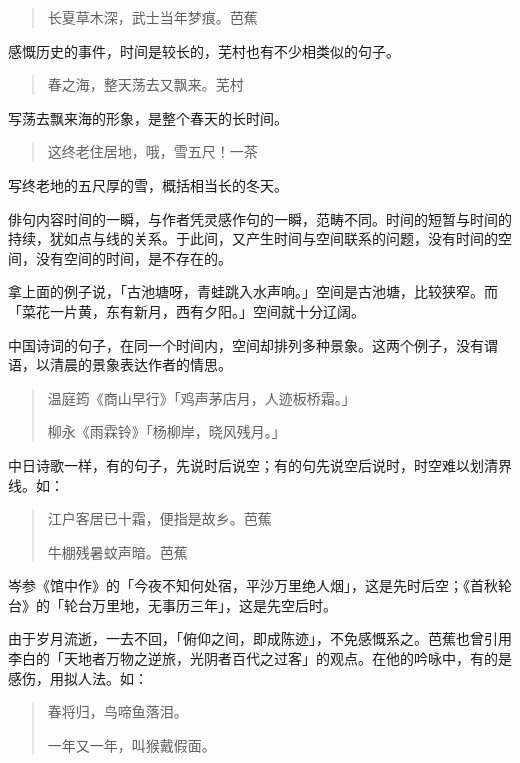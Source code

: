 {  \begin{quote}
      长夏草木深，武士当年梦痕。\hfill 芭蕉
  \end{quote}

  感慨历史的事件，时间是较长的，芜村也有不少相类似的句子。

  \begin{quote}
      春之海，整天荡去又飘来。\hfill 芜村
  \end{quote}

  写荡去飘来海的形象，是整个春天的长时间。

  \begin{quote}
      这终老住居地，哦，雪五尺！\hfill 一茶
  \end{quote}

  写终老地的五尺厚的雪，概括相当长的冬天。

  俳句内容时间的一瞬，与作者凭灵感作句的一瞬，范畴不同。时间的短暂与时间的持续，犹如点与线的关系。于此间，又产生时间与空间联系的问题，没有时间的空间，没有空间的时间，是不存在的。

  拿上面的例子说，「古池塘呀，青蛙跳入水声响。」空间是古池塘，比较狭窄。而「菜花一片黄，东有新月，西有夕阳。」空间就十分辽阔。

  中国诗词的句子，在同一个时间内，空间却排列多种景象。这两个例子，没有谓语，以清晨的景象表达作者的情思。
  \begin{quote}
      温庭筠《商山早行》「鸡声茅店月，人迹板桥霜。」

      柳永《雨霖铃》「杨柳岸，晓风残月。」
  \end{quote}

  中日诗歌一样，有的句子，先说时后说空；有的句先说空后说时，时空难以划清界线。如：

  \begin{quote}
      江户客居已十霜，便指是故乡。\hfill 芭蕉

      牛棚残暑蚊声暗。\hfill 芭蕉
  \end{quote}

  岑参《馆中作》的「今夜不知何处宿，平沙万里绝人烟」，这是先时后空；《首秋轮台》的「轮台万里地，无事历三年」，这是先空后时。

  由于岁月流逝，一去不回，「俯仰之间，即成陈迹」，不免感慨系之。芭蕉也曾引用李白的「天地者万物之逆旅，光阴者百代之过客」的观点。在他的吟咏中，有的是感伤，用拟人法。如：

  \begin{quote}
      春将归，鸟啼鱼落泪。

      一年又一年，叫猴戴假面。
  \end{quote}

}
